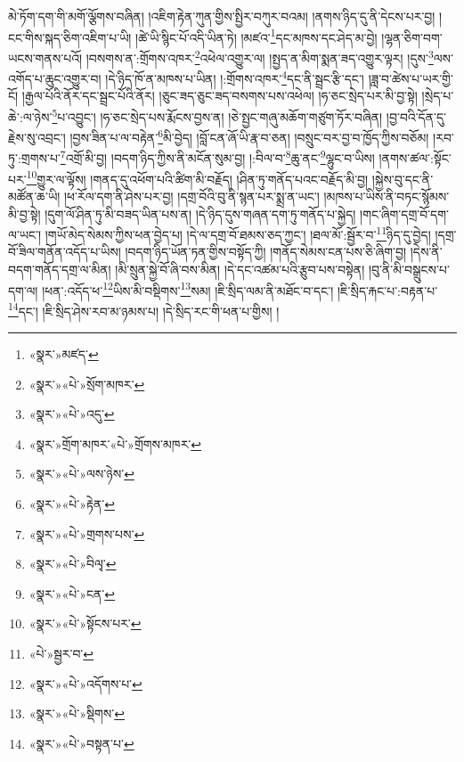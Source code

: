 མེ་ཏོག་དག་གི་མགོ་ལྕོགས་བཞིན། །འཇིག་རྟེན་ཀུན་གྱིས་སྤྱིར་བཀུར་བའམ། །ནགས་ཉིད་དུ་ནི་དེངས་པར་བྱ། །ངང་གིས་སྐད་ཅིག་འཇིག་པ་ཡི། །ཚེ་ཡི་སྙིང་པོ་འདི་ཡིན་ཏེ། །མཛའ་\footnote{«སྣར་»མཛད་}དང་མཁས་དང་ཤེད་མ་བྱེ། །ལྷན་ཅིག་བག་ཡངས་གནས་པའོ། །བསགས་ན་:གྲོགས་འཁར་\footnote{«སྣར་»«པེ་»སྲོག་མཁར་}འཕེལ་འགྱུར་ལ། །སྤྱད་ན་མིག་སྨན་ཟད་འགྱུར་ལྟར། །དུས་\footnote{«སྣར་»«པེ་»འདུ་}ལས་འགོད་པ་ཆུང་འགྱུར་བ། །དེ་ཉིད་ཁོ་ན་མཁས་པ་ཡིན། །:གྲོགས་འཁར་\footnote{«སྣར་»གྲོག་མཁར་«པེ་»གྲོགས་མཁར་}དང་ནི་སྦྲང་རྩི་དང་། །ཟླ་བ་ཚེས་པ་ཡར་གྱི་ངོ། །རྒྱལ་པོའི་ནོར་དང་སྦྲང་པོའི་ནོར། །ཅུང་ཟད་ཅུང་ཟད་བསགས་པས་འཕེལ། །ཧ་ཅང་སྲེད་པར་མི་བྱ་སྟེ། །སྲེད་པ་ཆེ་:ལ་ཉེས་\footnote{«སྣར་»«པེ་»ལས་ཉེས་}པ་འབྱུང་། །ཧ་ཅང་སྲེད་པས་རྨོངས་བྱས་ན། །ཅེ་སྤྱང་གཞུ་མཆོག་གཙུག་ཏོར་བཞིན། །བྱ་བའི་དོན་དུ་རྗེས་སུ་འབྲང་། །བྱས་ཟིན་པ་ལ་བརྟེན་\footnote{«སྣར་»«པེ་»རྟེན་}མི་བྱེད། །བློ་ངན་ཞོ་ཡི་རྣ་བ་ཅན། །བསྲུང་བར་བྱ་བ་ཁྱོད་ཀྱིས་བཅོམ། །རབ་ཏུ་:གྲགས་པ་\footnote{«སྣར་»«པེ་»གྲགས་པས་}འགྲོ་མི་བྱ། །བདག་ཉིད་ཀྱིས་ནི་མངོན་སུམ་བྱ། །:བིལ་བ་\footnote{«སྣར་»«པེ་»བིལྭ་}ཆུ་ནང་\footnote{«སྣར་»«པེ་»ངན་}ལྷུང་བ་ཡིས། །ནགས་ཚལ་:སྟོང་པར་\footnote{«སྣར་»«པེ་»སྟོངས་པར་}གྱུར་ལ་ལྟོས། །གནད་དུ་འཕོག་པའི་ཚིག་མི་བརྗོད། །ཤིན་ཏུ་གནོད་པའང་བརྗོད་མི་བྱ། །སྐྱེས་བུ་དང་ནི་མཚོན་ཆ་ཡི། །ཕ་རོལ་དག་ནི་ཤེས་པར་བྱ། །དགྲ་བོའི་བུ་ནི་སྙན་པར་སྨྲ་ན་ཡང་། །མཁས་པ་ཡིས་ནི་བཏང་སྙོམས་མི་བྱ་སྟེ། །དུག་ལོ་ཤིན་ཏུ་མི་བཟད་ཡིན་པས་ན། །དེ་ཉིད་དུས་གཞན་དག་ཏུ་གནོད་པ་སྐྱེད། །གང་ཞིག་དགྲ་བོ་དག་ལ་ཡང་། །གཡོ་མེད་སེམས་ཀྱིས་ཕན་བྱེད་པ། །དེ་ལ་དགྲ་བོ་ཐམས་ཅད་ཀྱང་། །ཐལ་མོ་:སྦྱོར་བ་\footnote{«པེ་»སྦྱར་བ་}ཉིད་དུ་བྱེད། །དགྲ་བོ་ཟིལ་གནོན་འདོད་པ་ཡིས། །བདག་ཉིད་ཡོན་ཏན་གྱིས་བསྟོད་ཀྱི། །གནོད་སེམས་ངན་པས་ཅི་ཞིག་བྱ། །དེས་ནི་བདག་གནོད་དགྲ་ལ་མིན། །མི་སྲུན་སྐྱེ་བོ་ཞི་བས་མིན། །དེ་དང་འཚམ་པའི་རྩུབ་པས་བསྟེན། །བུ་ནི་མི་བསྒྲུངས་པ་དག་ལ། །ཕན་:འདོད་ཕ་\footnote{«སྣར་»«པེ་»འདོགས་པ་}ཡིས་མི་བསྡིགས་\footnote{«སྣར་»«པེ་»སྡིགས་}སམ། །ཇི་སྲིད་ལམ་ནི་མཐོང་བ་དང་། །ཇི་སྲིད་རྐང་པ་:བརྟན་པ་\footnote{«སྣར་»«པེ་»བསྟན་པ་}དང་། །ཇི་སྲིད་ཤེས་རབ་མ་ཉམས་པ། །དེ་སྲིད་རང་གི་ཕན་པ་གྱིས། །
